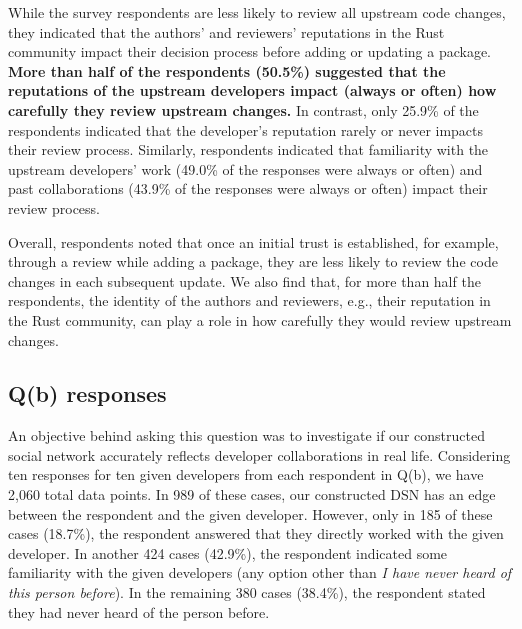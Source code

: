 \documentclass[10pt,journal,compsoc]{IEEEtran}
\begin{document}
While the survey respondents are less likely to review all upstream code changes, they indicated that the authors' and reviewers' reputations in the Rust community impact their decision process before adding or updating a package. \textbf{More than half of the respondents (50.5\%) suggested that the reputations of the upstream developers impact (always or often) how carefully they review upstream changes.} In contrast, only 25.9\% of the respondents indicated that the developer's reputation rarely or never impacts their review process. Similarly, respondents indicated that familiarity with the upstream developers' work (49.0\% of the responses were always or often) and past collaborations (43.9\% of the responses were always or often) impact their review process.


Overall, respondents noted that once an initial trust is established, for example, through a review while adding a package, they are less likely to review the code changes in each subsequent update. We also find that, for more than half the respondents, the identity of the authors and reviewers, e.g., their reputation in the Rust community, can play a role in how carefully they would review upstream changes.

\subsection{Q(b) responses}

An objective behind asking this question was to investigate if our constructed social network accurately reflects developer collaborations in real life. 
Considering ten responses for ten given developers from each respondent in Q(b), we have 2,060 total data points. In 989 of these cases, our constructed DSN has an edge between the respondent and the given developer. However, only in 185 of these cases (18.7\%), the respondent answered that they directly worked with the given developer. In another 424 cases (42.9\%), the respondent indicated some familiarity with the given developers (any option other than \textit{I have never heard of this person before}). In the remaining 380 cases (38.4\%), the respondent stated they had never heard of the person before.
\end{document}
